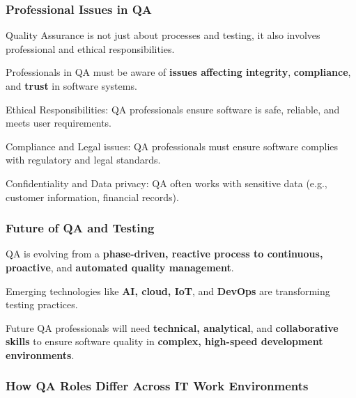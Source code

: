 \subsubsection{Professional Issues in QA}

\indent 

Quality Assurance is not just about processes and testing, it also involves professional and ethical responsibilities. 

Professionals in QA must be aware of \textbf{issues affecting integrity}, \textbf{compliance}, and \textbf{trust} in software systems.

Ethical Responsibilities: QA professionals ensure software is safe, reliable, and meets user requirements.

Compliance and Legal issues: QA professionals must ensure software complies with regulatory and legal standards.

Confidentiality and Data privacy: QA often works with sensitive data (e.g., customer information, financial records).

\subsubsection{Future of QA and Testing}

\indent 

QA is evolving from a \textbf{phase-driven, reactive process to continuous, proactive}, and \textbf{automated quality management}.

Emerging technologies like \textbf{AI, cloud, IoT}, and \textbf{DevOps} are transforming testing practices.

Future QA professionals will need \textbf{technical, analytical}, and \textbf{collaborative skills} to ensure software quality in \textbf{complex, high-speed development environments}.

\subsubsection{How QA Roles Differ Across IT Work Environments}

